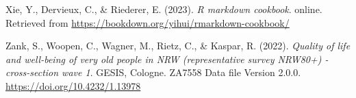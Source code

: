 \documentclass[
  doc]{apa6}
\newlength{\cslhangindent}
\newlength{\cslentryspacingunit} %
\newenvironment{CSLReferences}[2] %
 {%
  \setlength{\parindent}{0pt}
  \ifodd #1
  \let\oldpar\par
  \def\par{\hangindent=\cslhangindent\oldpar}
  \fi
  \setlength{\parskip}{#2\cslentryspacingunit}
 }%
 {}
\begin{document}
\begin{CSLReferences}{1}{0}
\leavevmode{}%
Xie, Y., Dervieux, C., \& Riederer, E. (2023). \emph{R markdown cookbook}. online. Retrieved from \url{https://bookdown.org/yihui/rmarkdown-cookbook/}

\leavevmode{}%
Zank, S., Woopen, C., Wagner, M., Rietz, C., \& Kaspar, R. (2022). \emph{Quality of life and well-being of very old people in NRW (representative survey NRW80+) - cross-section wave 1}. GESIS, Cologne. ZA7558 Data file Version 2.0.0. \url{https://doi.org/10.4232/1.13978}

\end{CSLReferences}


\clearpage
\renewcommand{\listfigurename}{Figure captions}

\clearpage
\renewcommand{\listtablename}{Table captions}
\end{document}

